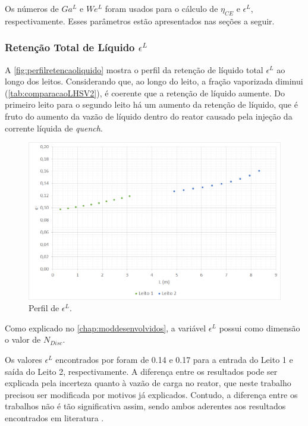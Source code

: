 Os números de $Ga^L$ e $We^L$ foram usados para o cálculo de $\eta_{CE}$ e
$\epsilon^{L}$, respectivamente. Esses parâmetros estão apresentados nas seções
a seguir.

\subsubsection{Retenção Total de Líquido $\epsilon^{L}$}
\label{retencaototaldeliquido}

A \autoref{fig:perfilretencaoliquido} mostra o perfil da retenção de líquido
total $\epsilon^{L}$ ao longo dos leitos. Considerando que, ao longo do leito, a
fração vaporizada diminui (\autoref{tab:comparacaoLHSV2}), é coerente que a
retenção de líquido aumente. Do primeiro leito para o segundo leito há um
aumento da retenção de líquido, que é fruto do aumento da vazão de líquido
dentro do reator causado pela injeção da corrente líquida de \emph{quench}.

\begin{figure}[htb]
\centering
\includegraphics[scale=0.4]{images/Chap4/perfilretencaoliquido.png}
\caption{Perfil de $\epsilon^{L}$.}
\label{fig:perfilretencaoliquido}
\end{figure}

Como explicado no \autoref{chap:moddesenvolvidos}, a variável $\epsilon^{L}$
possui como dimensão o valor de $N_{Disc}$.

Os valores $\epsilon^{L}$ encontrados por  foram de
\num{0,14} e \num{0,17} para a entrada do Leito 1 e saída do Leito 2,
respectivamente. A diferença entre os resultados pode ser explicada pela
incerteza quanto à vazão de carga no reator, que neste trabalho precisou ser
modificada por motivos já explicados. Contudo, a diferença entre os trabalhos
não é tão significativa assim, sendo ambos aderentes aos resultados
encontrados em literatura \cite{Ancheyta2011}.

